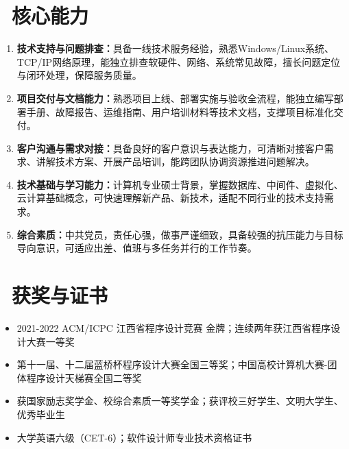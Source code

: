\documentclass[11pt,a4paper]{ctexart}
\newcommand{\sect}[2]{%
  \section{\texorpdfstring{\makebox[\widthof{\faGraduationCap}][c]{{\mdseries\color{themecolor}#1}}\ #2}{#2}}
}
\begin{document}
\sect{\faStar}{核心能力}
\begin{enumerate}[topsep=0pt, partopsep=1pt, itemsep=2pt, parsep=0pt]
  \item \textbf{技术支持与问题排查：}具备一线技术服务经验，熟悉Windows/Linux系统、TCP/IP网络原理，能独立排查软硬件、网络、系统常见故障，擅长问题定位与闭环处理，保障服务质量。
  \item \textbf{项目交付与文档能力：}熟悉项目上线、部署实施与验收全流程，能独立编写部署手册、故障报告、运维指南、用户培训材料等技术文档，支撑项目标准化交付。
  \item \textbf{客户沟通与需求对接：}具备良好的客户意识与表达能力，可清晰对接客户需求、讲解技术方案、开展产品培训，能跨团队协调资源推进问题解决。
  \item \textbf{技术基础与学习能力：}计算机专业硕士背景，掌握数据库、中间件、虚拟化、云计算基础概念，可快速理解新产品、新技术，适配不同行业的技术支持需求。
  \item \textbf{综合素质：}中共党员，责任心强，做事严谨细致，具备较强的抗压能力与目标导向意识，可适应出差、值班与多任务并行的工作节奏。
\end{enumerate}

\sect{\faTrophy}{获奖与证书}
\begin{itemize}
  \item 2021-2022 ACM/ICPC 江西省程序设计竞赛 金牌；连续两年获江西省程序设计大赛一等奖
  \item 第十一届、十二届蓝桥杯程序设计大赛全国三等奖；中国高校计算机大赛-团体程序设计天梯赛全国二等奖
  \item 获国家励志奖学金、校综合素质一等奖学金；获评校三好学生、文明大学生、优秀毕业生
  \item 大学英语六级（CET-6）；软件设计师专业技术资格证书
\end{itemize}
\end{document}
